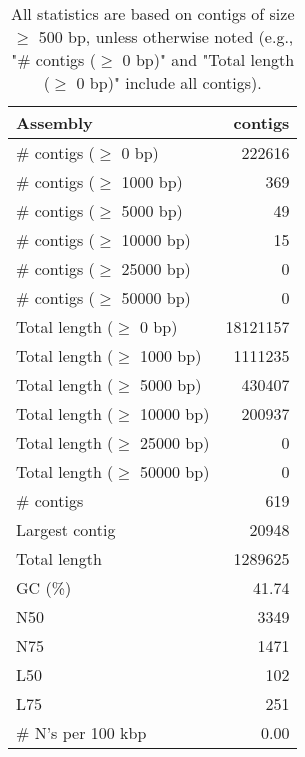 \documentclass[12pt,a4paper]{article}
\begin{document}
\begin{table}[ht]
\begin{center}
\caption{All statistics are based on contigs of size $\geq$ 500 bp, unless otherwise noted (e.g., "\# contigs ($\geq$ 0 bp)" and "Total length ($\geq$ 0 bp)" include all contigs).}
\begin{tabular}{|l*{1}{|r}|}
\hline
Assembly & contigs \\ \hline
\# contigs ($\geq$ 0 bp) & 222616 \\ \hline
\# contigs ($\geq$ 1000 bp) & 369 \\ \hline
\# contigs ($\geq$ 5000 bp) & 49 \\ \hline
\# contigs ($\geq$ 10000 bp) & 15 \\ \hline
\# contigs ($\geq$ 25000 bp) & 0 \\ \hline
\# contigs ($\geq$ 50000 bp) & 0 \\ \hline
Total length ($\geq$ 0 bp) & 18121157 \\ \hline
Total length ($\geq$ 1000 bp) & 1111235 \\ \hline
Total length ($\geq$ 5000 bp) & 430407 \\ \hline
Total length ($\geq$ 10000 bp) & 200937 \\ \hline
Total length ($\geq$ 25000 bp) & 0 \\ \hline
Total length ($\geq$ 50000 bp) & 0 \\ \hline
\# contigs & 619 \\ \hline
Largest contig & 20948 \\ \hline
Total length & 1289625 \\ \hline
GC (\%) & 41.74 \\ \hline
N50 & 3349 \\ \hline
N75 & 1471 \\ \hline
L50 & 102 \\ \hline
L75 & 251 \\ \hline
\# N's per 100 kbp & 0.00 \\ \hline
\end{tabular}
\end{center}
\end{table}
\end{document}
